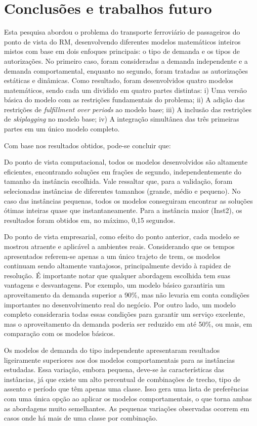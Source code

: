 \chapter{Conclusões e trabalhos futuro}

Esta pesquisa abordou o problema do transporte ferroviário de passageiros do ponto de vista do RM, desenvolvendo diferentes modelos matemáticos inteiros mistos com base em dois enfoques principais: o tipo de demanda e os tipos de autorizações. No primeiro caso, foram consideradas a demanda independente e a demanda comportamental, enquanto no segundo, foram tratadas as autorizações estáticas e dinâmicas. Como resultado, foram desenvolvidos quatro modelos matemáticos, sendo cada um dividido em quatro partes distintas: i) Uma versão básica do modelo com as restrições fundamentais do problema; ii) A adição das restrições de \textit{fulfillment over periods} ao modelo base; iii) A inclusão das restrições de \textit{skiplagging} no modelo base; iv) A integração simultânea das três primeiras partes em um único modelo completo.

Com base nos resultados obtidos, pode-se concluir que:

Do ponto de vista computacional, todos os modelos desenvolvidos são altamente eficientes, encontrando soluções em frações de segundo, independentemente do tamanho da instância escolhida. Vale ressaltar que, para a validação, foram selecionadas instâncias de diferentes tamanhos (grande, médio e pequeno). No caso das instâncias pequenas, todos os modelos conseguiram encontrar as soluções ótimas inteiras quase que instantaneamente. Para a instância maior (Inst2), os resultados foram obtidos em, no máximo, 0,15 segundos.

Do ponto de vista empresarial, como efeito do ponto anterior, cada modelo se mostrou atraente e aplicável a ambientes reais. Considerando que os tempos apresentados referem-se apenas a um único trajeto de trem, os modelos continuam sendo altamente vantajosos, principalmente devido à rapidez de resolução. É importante notar que qualquer abordagem escolhida tem suas vantagens e desvantagens. Por exemplo, um modelo básico garantiria um aproveitamento da demanda superior a 90\%, mas não levaria em conta condições importantes no desenvolvimento real do negócio. Por outro lado, um modelo completo consideraria todas essas condições para garantir um serviço excelente, mas o aproveitamento da demanda poderia ser reduzido em até 50\%, ou mais, em comparação com os modelos básicos.

Os modelos de demanda do tipo independente apresentaram resultados ligeiramente superiores aos dos modelos comportamentais para as instâncias estudadas. Essa variação, embora pequena, deve-se às características das instâncias, já que existe um alto percentual de combinações de trecho, tipo de assento e período que têm apenas uma classe. Isso gera uma lista de preferências com uma única opção ao aplicar os modelos comportamentais, o que torna ambas as abordagens muito semelhantes. As pequenas variações observadas ocorrem em casos onde há mais de uma classe por combinação.

